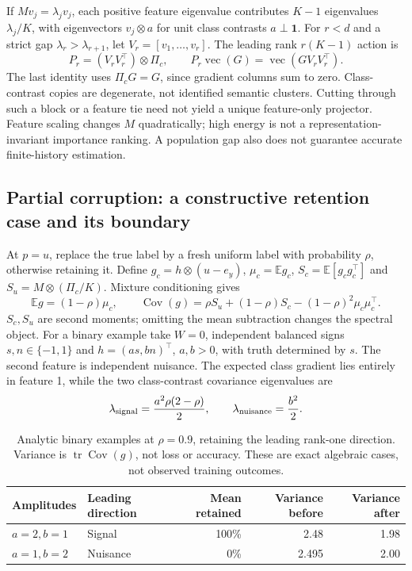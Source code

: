 \documentclass[10pt]{article}
\newcommand{\E}{\mathbb{E}}
\newcommand{\Cov}{\operatorname{Cov}}
\begin{document}
If $Mv_j=\lambda_jv_j$, each positive feature eigenvalue contributes $K-1$ eigenvalues $\lambda_j/K$, with eigenvectors $v_j\otimes a$ for unit class contrasts $a\perp\mathbf1$. For $r<d$ and a strict gap $\lambda_r>\lambda_{r+1}$, let $V_r=[v_1,\ldots,v_r]$. The leading rank $r(K-1)$ action is
\begin{equation}
P_r=(V_rV_r^\top)\otimes\Pi_c,\qquad
P_r\operatorname{vec}(G)=\operatorname{vec}(GV_rV_r^\top).\label{eq:feature-projection}
\end{equation}
The last identity uses $\Pi_cG=G$, since gradient columns sum to zero. Class-contrast copies are degenerate, not identified semantic clusters. Cutting through such a block or a feature tie need not yield a unique feature-only projector. Feature scaling changes $M$ quadratically; high energy is not a representation-invariant importance ranking. A population gap also does not guarantee accurate finite-history estimation.

\newpage
\subsection{Partial corruption: a constructive retention case and its boundary}
At $p=u$, replace the true label by a fresh uniform label with probability $\rho$, otherwise retaining it. Define $g_c=h\otimes(u-e_y)$, $\mu_c=\E g_c$, $S_c=\E[g_cg_c^\top]$ and $S_u=M\otimes(\Pi_c/K)$. Mixture conditioning gives
\begin{equation}
\E g=(1-\rho)\mu_c,\qquad
\Cov(g)=\rho S_u+(1-\rho)S_c-(1-\rho)^2\mu_c\mu_c^\top.\label{eq:mixed-feature-covariance}
\end{equation}
$S_c,S_u$ are second moments; omitting the mean subtraction changes the spectral object. For a binary example take $W=0$, independent balanced signs $s,n\in\{-1,1\}$ and $h=(as,bn)^\top$, $a,b>0$, with truth determined by $s$. The second feature is independent nuisance. The expected class gradient lies entirely in feature 1, while the two class-contrast covariance eigenvalues are
\begin{equation}
\lambda_{\rm signal}=\frac{a^2\rho(2-\rho)}2,\qquad
\lambda_{\rm nuisance}=\frac{b^2}2.
\end{equation}

\begin{table}[!ht]
\centering\small
\begin{tabular}{llrrr}\toprule
Amplitudes & Leading direction & Mean retained & Variance before & Variance after\\\midrule
$a=2,b=1$ & Signal & 100\% & 2.48 & 1.98\\
$a=1,b=2$ & Nuisance & 0\% & 2.495 & 2.00\\\bottomrule
\end{tabular}
\caption{Analytic binary examples at $\rho=0.9$, retaining the leading rank-one direction. Variance is $\operatorname{tr}\Cov(g)$, not loss or accuracy. These are exact algebraic cases, not observed training outcomes.}
\label{tab:feature-geometry}
\end{table}
\end{document}
